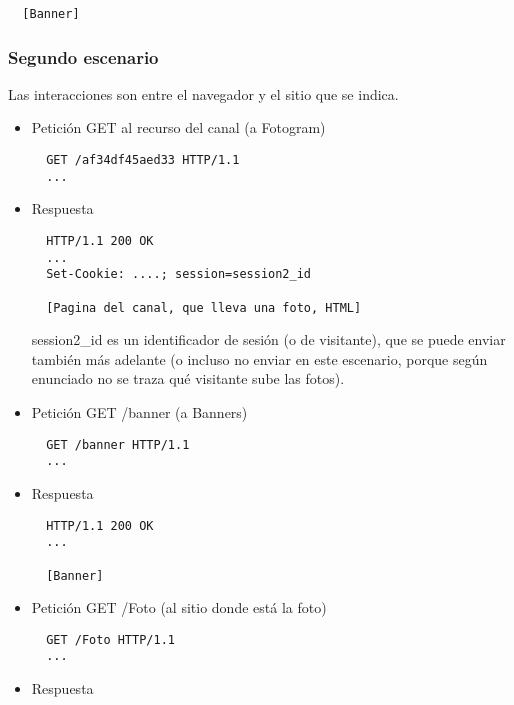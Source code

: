 {\begin{itemize}
\begin{verbatim}
  [Banner]
\end{verbatim}

\end{itemize}

\subsubsection*{Segundo escenario}

Las interacciones son entre el navegador y el sitio que se indica.

\begin{itemize}
\item Petición GET al recurso del canal (a Fotogram)

\begin{verbatim}
  GET /af34df45aed33 HTTP/1.1
  ...
\end{verbatim}

\item Respuesta

\begin{verbatim}
  HTTP/1.1 200 OK
  ...
  Set-Cookie: ....; session=session2_id

  [Pagina del canal, que lleva una foto, HTML]
\end{verbatim}

session2\_id es un identificador de sesión (o de visitante), que se puede enviar también más adelante (o incluso no enviar en este escenario, porque según enunciado no se traza qué visitante sube las fotos).

\item Petición GET /banner (a Banners)

\begin{verbatim}
  GET /banner HTTP/1.1
  ...
\end{verbatim}

\item Respuesta

\begin{verbatim}
  HTTP/1.1 200 OK
  ...

  [Banner]
\end{verbatim}

\item Petición GET /Foto (al sitio donde está la foto)

\begin{verbatim}
  GET /Foto HTTP/1.1
  ...
\end{verbatim}

\item Respuesta


\end{itemize}}
